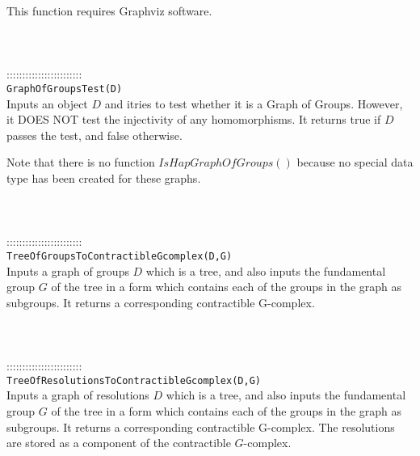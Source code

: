 \documentclass[a4paper,11pt]{report}
\begin{document}
{ This function requires Graphviz software. \\
 \\
 \\
 \\
 ::::::::::::::::::::::::\\
 \texttt{GraphOfGroupsTest(D) }\\
 

 Inputs an object $D$ and itries to test whether it is a Graph of Groups. However, it DOES NOT test
the injectivity of any homomorphisms. It returns true if $D$ passes the test, and false otherwise. 

 Note that there is no function $IsHapGraphOfGroups()$ because no special data type has been created for these graphs. \\
 \\
 \\
 \\
 ::::::::::::::::::::::::\\
 \texttt{TreeOfGroupsToContractibleGcomplex(D,G) }\\
 

 Inputs a graph of groups $D$ which is a tree, and also inputs the fundamental group $G$ of the tree in a form which contains each of the groups in the graph as
subgroups. It returns a corresponding contractible G-complex. \\
 \\
 \\
 \\
 ::::::::::::::::::::::::\\
 \texttt{TreeOfResolutionsToContractibleGcomplex(D,G) }\\
 

 Inputs a graph of resolutions $D$ which is a tree, and also inputs the fundamental group $G$ of the tree in a form which contains each of the groups in the graph as
subgroups. It returns a corresponding contractible G-complex. The resolutions
are stored as a component of the contractible $G$-complex. \\
 \\
 \\
 }

 
\end{document}
